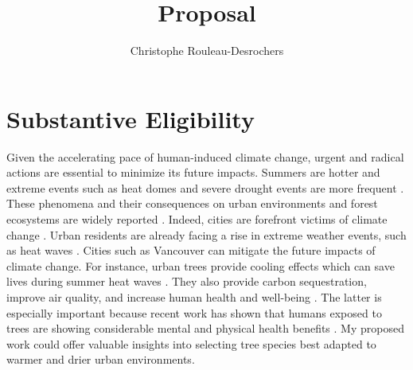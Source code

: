 \documentclass[11pt,letter]{article}
\title{Proposal}
\author{Christophe Rouleau-Desrochers}
\begin{document}

\maketitle


\section *{Substantive Eligibility} 
Given the accelerating pace of human-induced climate change, urgent and radical actions are essential to minimize its future impacts. Summers are hotter and extreme events such as heat domes and severe drought events are more frequent \cite{zhang_increased_2023}. These phenomena and their consequences on urban environments and forest ecosystems are widely reported \cite{allen_global_2010, mccarthy_climate_2010}. Indeed, cities are forefront victims of climate change \citep{das_unraveling_2024, corburn_cities_2009}. Urban residents are already facing a rise in extreme weather events, such as heat waves \cite{das_unraveling_2024}. Cities such as Vancouver can mitigate the future impacts of climate change. For instance, urban trees provide cooling effects which can save lives during summer heat waves \cite{ettinger_street_2024, zandler_cooling_2024}. They also provide carbon sequestration, improve air quality, and increase human health and well-being \citep{wolf_urban_2020}. The latter is especially important because recent work has shown that humans exposed to trees are showing considerable mental and physical health benefits \citep{wolf_urban_2020, turnerskoff_benefits_2019}. My proposed work could offer valuable insights into selecting tree species best adapted to warmer and drier urban environments.
\end{document}
